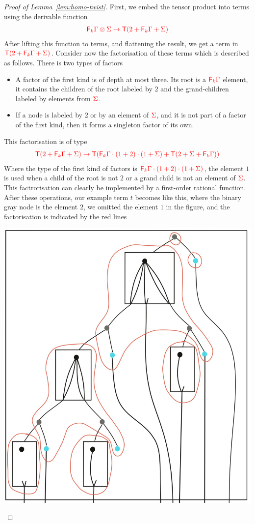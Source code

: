 \begin{proof}[Proof of Lemma~\ref{lem:homo-twist}]
First, we embed the tensor product into terms using the derivable function
\begin{align*}
{\color{red}{{\color{red}{\mathsf F_{k}}}\Gamma \otimes \Sigma \to {\color{red}{\mathsf T}}(2+{\color{red}{\mathsf F_{k}}}\Gamma +\Sigma)}}
\end{align*}
After lifting this function to terms, and flattening the result, we get a term in ${\color{red}{{\color{red}{\mathsf T}}(2+{\color{red}{\mathsf F_{k}}}\Gamma +\Sigma)}}$. 
Consider now the factorisation of these terms
 which is described as follows. There is two types of factors
\begin{itemize}
\item  A factor of the first kind is of depth at most three. Its root is a ${\color{red}{\mathsf F_{k}}}{\color{red}{\Gamma}}$ element, it contains the children of the root labeled by $2$ and the grand-children labeled by elements from ${\color{red}{\Sigma}}$.
\item If a node is labeled by $2$ or by an element of ${\color{red}{\Sigma}}$, and it is not part of a factor of the first kind, then it forms a singleton factor of its own.    
\end{itemize}
This factorisation is of type
\begin{align*}
{\color{red}{{\color{red}{\mathsf T}}(2+{\color{red}{\mathsf F_{k}}}\Gamma +\Sigma) \to {\color{red}{\mathsf T}}({\color{red}{\mathsf F_{k}}}\Gamma\cdot(1+2)\cdot(1+\Sigma)+{\color{red}{\mathsf T}}(2+\Sigma+{\color{red}{\mathsf F_{k}}}\Gamma))}}
\end{align*}
Where the type of the first kind of factors is ${\color{red}{{\color{red}{\mathsf F_{k}}}\Gamma\cdot(1+2)\cdot(1+\Sigma)}}$, the element $1$ is used when a child of the root is not $2$ or a grand child is not an element of ${\color{red}{\Sigma}}$. 
This factrorisation can clearly be implemented by a first-order rational function. After these operations, our example term $t$ becomes like this, where the binary gray node is the element $2$, we omitted the element $1$ in the figure, and the factorisation is indicated by the red lines
\begin{center}
\includegraphics[scale=.09]{MyPic23.jpg}

\end{center}
\end{proof}
